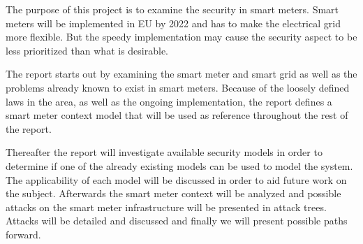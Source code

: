 The purpose of this project is to examine the security in smart meters.
Smart meters will be implemented in EU by 2022 and has to make the electrical grid more flexible.
But the speedy implementation may cause the security aspect to be less prioritized than what is desirable.

The report starts out by examining the smart meter and smart grid as well as the problems already known to exist in smart meters.
Because of the loosely defined laws in the area, as well as the ongoing implementation, the report defines a smart meter context model that will be used as reference throughout the rest of the report.

Thereafter the report will investigate available security models in order to determine if one of the already existing models can be used to model the system.
The applicability of each model will be discussed in order to aid future work on the subject.
Afterwards the smart meter context will be analyzed and possible attacks on the smart meter infrastructure will be presented in attack trees.
Attacks will be detailed and discussed and finally we will present possible paths forward.